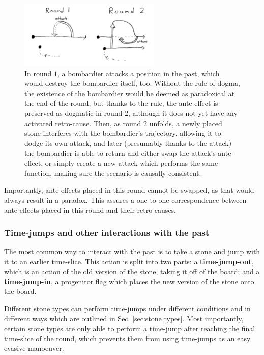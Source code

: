 \documentclass[12pt]{article}
\begin{document}
	\begin{figure}[h]
\begin{center}
    \includegraphics[width=0.6\textwidth]{images/diag_dogma}
 \caption{In round $1$, a bombardier attacks a position in the past, which would destroy the bombardier itself, too. Without the rule of dogma, the existence of the bombardier would be deemed as paradoxical at the end of the round, but thanks to the rule, the ante-effect is preserved as dogmatic in round $2$, although it does not yet have any activated retro-cause. Then, as round $2$ unfolds, a newly placed stone interferes with the bombardier's trajectory, allowing it to dodge its own attack, and later (presumably thanks to the attack) the bombardier is able to return and either swap the attack's ante-effect, or simply create a new attack which performs the same function, making sure the scenario is causally consistent.}\label{fig:dogma}
\end{center}
\end{figure}
	
	Importantly, ante-effects placed in this round cannot be swapped, as that would always result in a paradox. This assures a one-to-one correspondence between ante-effects placed in this round and their retro-causes.
	
	\subsubsection{Time-jumps and other interactions with the past} \label{sec:timejumps}
	The most common way to interact with the past is to take a stone and jump with it to an earlier time-slice. This action is split into two parts: a \textbf{time-jump-out}, which is an action of the old version of the stone, taking it off of the board; and a \textbf{time-jump-in}, a progenitor flag which places the new version of the stone onto the board.
	
	Different stone types can perform time-jumps under different conditions and in different ways which are outlined in Sec. \ref{sec:stone types}. Most importantly, certain stone types are only able to perform a time-jump after reaching the final time-slice of the round, which prevents them from using time-jumps as an easy evasive manoeuver.
	
\end{document}
